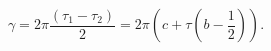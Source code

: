 \begin{equation} 
\gamma = 2\pi\frac{(\tau_1-\tau_2)}{2} =  2\pi (c + \tau (b-\frac{1}{2})).  
\label{3} 
\end{equation} 
